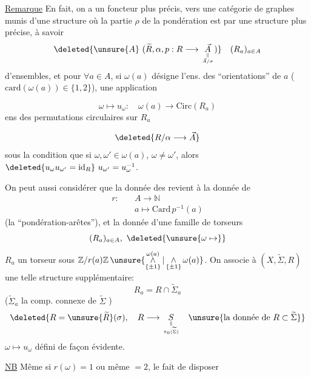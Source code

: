 \uline{Remarque} En fait, on a un foncteur plus précis, vers une catégorie de graphes munis d'une structure où la partie $\rho$ de la pondération est  par une structure plus précise, à savoir 
\[
\deleted{\unsure{A}\ (\widetilde R,\alpha,p:R\longrightarrow\underset{\Vert\atop\vec A/\sigma}{\vec A})}\quad(R_a)_{a\in A}
\]
d'ensembles, et pour $\forall a\in A$, si $\omega(a)$ désigne l'ens. des ``orientations'' de $a$ ($\mathrm{card}(\omega(a))\in\{1,2\}$), une application


\[
\omega\longmapsto u_\omega:\quad\omega(a)\longrightarrow\mathrm{Circ}(R_a)
\]
ens des permutations circulaires sur $R_a$

\[
\deleted{R/\alpha\longrightarrow\vec A}
\]
sous la condition que si $\omega,\omega'\in\omega(a)$, $\omega\ne\omega'$, alors $\deleted{u_\omega u_{\omega'}=\mathrm{id}_R}\ u_{\omega'}=u_\omega^{-1}$.

On peut aussi considérer que la donnée des  revient à la donnée de
\[
\begin{aligned}
r:&\quad A\longrightarrow\mathbb N\\
&\quad a\longmapsto\mathrm{Card}\,p^{-1}(a)
\end{aligned}
\]
(la ``pondération-arêtes''), et la donnée d'une famille de torseurs
\[
(R_a)_{a\in A},\ \deleted{\unsure{\omega\mapsto}}
\]
$R_a$ un torseur sous $\mathbb Z/r(a)\mathbb Z\,\unsure{\mathop{\wedge}\limits_{\{\pm1\}}^{\omega(a)}|\mathop{\wedge}\limits_{\{\pm1\}}\omega(a)}$. On associe à $(X,\widetilde\Sigma,R)$ une telle structure supplémentaire:
\[
R_a=R\cap\widetilde\Sigma_a
\]
($\widetilde\Sigma_a$ la comp. connexe de $\widetilde\Sigma$ )
\[
\deleted{R=\unsure{\widetilde R}(\sigma),\quad R\longrightarrow\underset{\Vert\atop\pi_0(\widetilde\Sigma)}{S}\quad\unsure{\text{la donnée de }R\subset\widetilde\Sigma}}
\]
$\omega\mapsto u_\omega$ défini de façon évidente.


\uline{NB} Même si $r(\omega)=1$ ou même $=2$, le fait de disposer
